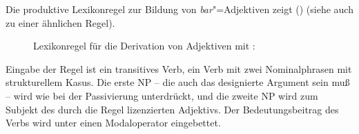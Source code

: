 Die produktive Lexikonregel zur Bildung von \emph{bar}"=Adjektiven zeigt () (siehe auch 
zu einer ähnlichen Regel).
\begin{figure}[htbp]
\eas
\label{lr-bar-adj}
Lexikonregel für die Derivation von Adjektiven mit \bars:\\
\zs
\vspace{-\baselineskip}\end{figure}
Eingabe der Regel ist ein transitives Verb, \dash ein Verb mit zwei Nominalphrasen mit strukturellem Kasus.
Die erste NP -- die auch das designierte Argument sein muß  -- wird wie bei der Passivierung unterdrückt, 
und die zweite NP  wird zum Subjekt des durch die Regel lizenzierten Adjektivs.
Der Bedeutungsbeitrag des Verbs  wird unter einen Modaloperator eingebettet.
